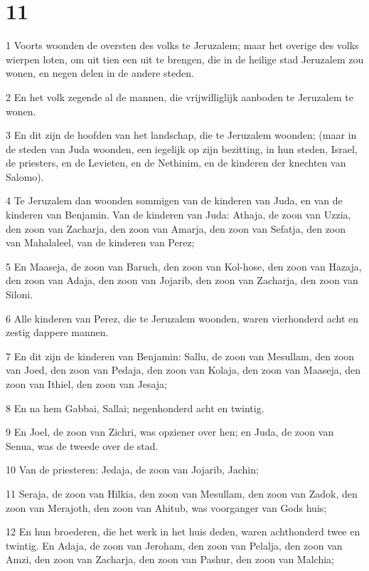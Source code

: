 \chapter{11}

\par 1 Voorts woonden de oversten des volks te Jeruzalem; maar het overige des volks wierpen loten, om uit tien een uit te brengen, die in de heilige stad Jeruzalem zou wonen, en negen delen in de andere steden.
\par 2 En het volk zegende al de mannen, die vrijwilliglijk aanboden te Jeruzalem te wonen.
\par 3 En dit zijn de hoofden van het landschap, die te Jeruzalem woonden; (maar in de steden van Juda woonden, een iegelijk op zijn bezitting, in hun steden, Israel, de priesters, en de Levieten, en de Nethinim, en de kinderen der knechten van Salomo).
\par 4 Te Jeruzalem dan woonden sommigen van de kinderen van Juda, en van de kinderen van Benjamin. Van de kinderen van Juda: Athaja, de zoon van Uzzia, den zoon van Zacharja, den zoon van Amarja, den zoon van Sefatja, den zoon van Mahalaleel, van de kinderen van Perez;
\par 5 En Maaseja, de zoon van Baruch, den zoon van Kol-hose, den zoon van Hazaja, den zoon van Adaja, den zoon van Jojarib, den zoon van Zacharja, den zoon van Siloni.
\par 6 Alle kinderen van Perez, die te Jeruzalem woonden, waren vierhonderd acht en zestig dappere mannen.
\par 7 En dit zijn de kinderen van Benjamin: Sallu, de zoon van Mesullam, den zoon van Joed, den zoon van Pedaja, den zoon van Kolaja, den zoon van Maaseja, den zoon van Ithiel, den zoon van Jesaja;
\par 8 En na hem Gabbai, Sallai; negenhonderd acht en twintig.
\par 9 En Joel, de zoon van Zichri, was opziener over hen; en Juda, de zoon van Senua, was de tweede over de stad.
\par 10 Van de priesteren: Jedaja, de zoon van Jojarib, Jachin;
\par 11 Seraja, de zoon van Hilkia, den zoon van Mesullam, den zoon van Zadok, den zoon van Merajoth, den zoon van Ahitub, was voorganger van Gods huis;
\par 12 En hun broederen, die het werk in het huis deden, waren achthonderd twee en twintig. En Adaja, de zoon van Jeroham, den zoon van Pelalja, den zoon van Amzi, den zoon van Zacharja, den zoon van Pashur, den zoon van Malchia;
